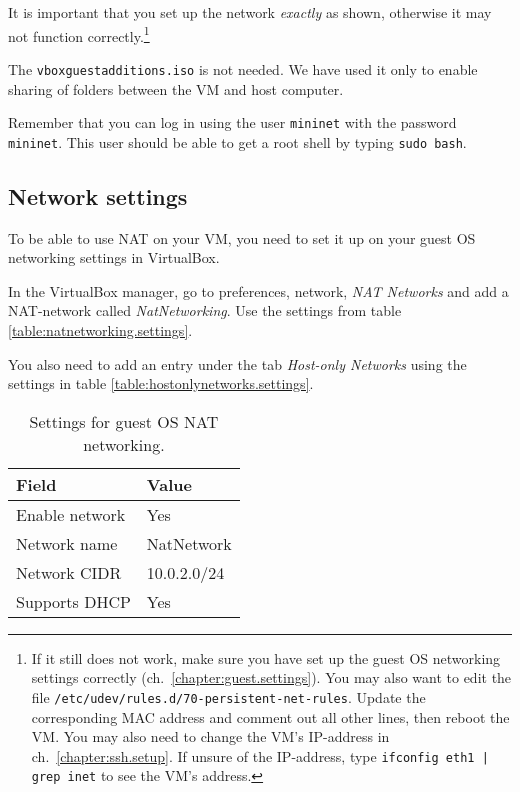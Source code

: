 It is important that you set up the network
\textit{exactly} as shown, otherwise it may not function correctly.\footnote{
  If it still does not work, make sure you have set up the guest OS
    networking settings correctly (ch.~\vref{chapter:guest.settings}).
  You may also want to edit the file
  \texttt{/etc/udev/rules.d/70-persistent-net-rules}.
  Update the corresponding MAC address and comment out all other lines, then
  reboot the VM.
   You may also need to change the VM's IP-address in
  ch.~\vref{chapter:ssh.setup}. If unsure of the IP-address, type
  \texttt{ifconfig eth1 | grep inet} to see the VM's address.
}

The \texttt{vboxguestadditions.iso} is not needed. We have used it only to
enable sharing of folders between the VM and host computer.

Remember that you can log in using the user \texttt{mininet} with the
password \texttt{mininet}.  This user should be able to get a root shell by
typing \texttt{sudo bash}.

\subsection{Network settings}
\label{chapter:guest.settings}

To be able to use \ac{NAT} on your VM, you need to set it up on your guest
OS networking settings in VirtualBox.

In the VirtualBox manager, go to preferences, network, \textit{NAT Networks}
and add a \acs{NAT}-network called \textit{NatNetworking}. Use the settings
from table \vref{table:natnetworking.settings}.

You also need to add an entry under the tab \textit{Host-only Networks}
using the settings in table
\vref{table:hostonlynetworks.settings}.

\begin{table}[H]
  \centering
  \begin{tabular}{ll}
    \hline \textbf{Field} & \textbf{Value} \\
    \hline
      Enable network & Yes \\
      Network name & NatNetwork \\
      Network CIDR & 10.0.2.0/24 \\
      Supports DHCP & Yes \\
    \hline
  \end{tabular}
  \caption{Settings for guest OS NAT networking.}
  \label{table:natnetworking.settings}
\end{table}

